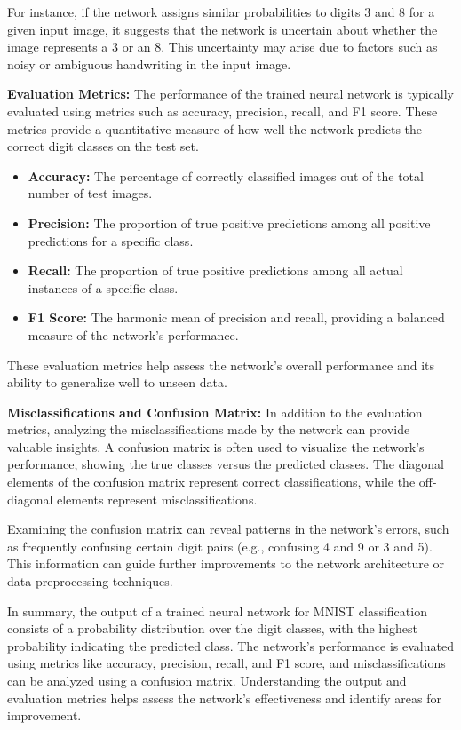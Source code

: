 For instance, if the network assigns similar probabilities to digits 3 and 8 for a given input image, it suggests that the network is uncertain about whether the image represents a 3 or an 8. This uncertainty may arise due to factors such as noisy or ambiguous handwriting in the input image.

\textbf{Evaluation Metrics:}
The performance of the trained neural network is typically evaluated using metrics such as accuracy, precision, recall, and F1 score. These metrics provide a quantitative measure of how well the network predicts the correct digit classes on the test set.

\begin{itemize}
  \item \textbf{Accuracy:} The percentage of correctly classified images out of the total number of test images.
  \item \textbf{Precision:} The proportion of true positive predictions among all positive predictions for a specific class.
  \item \textbf{Recall:} The proportion of true positive predictions among all actual instances of a specific class.
  \item \textbf{F1 Score:} The harmonic mean of precision and recall, providing a balanced measure of the network's performance.
\end{itemize}

These evaluation metrics help assess the network's overall performance and its ability to generalize well to unseen data.

\textbf{Misclassifications and Confusion Matrix:}
In addition to the evaluation metrics, analyzing the misclassifications made by the network can provide valuable insights. A confusion matrix is often used to visualize the network's performance, showing the true classes versus the predicted classes. The diagonal elements of the confusion matrix represent correct classifications, while the off-diagonal elements represent misclassifications.

Examining the confusion matrix can reveal patterns in the network's errors, such as frequently confusing certain digit pairs (e.g., confusing 4 and 9 or 3 and 5). This information can guide further improvements to the network architecture or data preprocessing techniques.

In summary, the output of a trained neural network for MNIST classification consists of a probability distribution over the digit classes, with the highest probability indicating the predicted class. The network's performance is evaluated using metrics like accuracy, precision, recall, and F1 score, and misclassifications can be analyzed using a confusion matrix. Understanding the output and evaluation metrics helps assess the network's effectiveness and identify areas for improvement.

